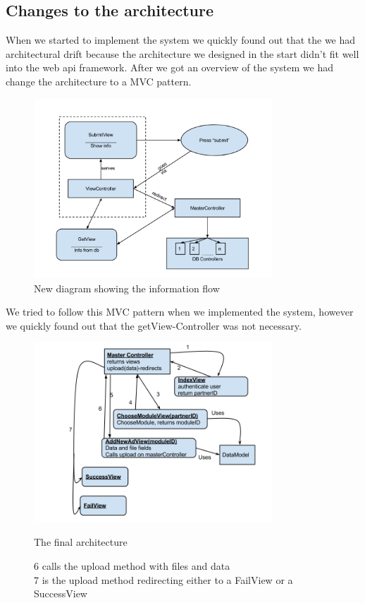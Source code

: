 \subsection{Changes to the architecture}
When we started to implement the system we quickly found out that the we had architectural drift because the architecture we designed in the start didn't fit well into the web api framework. After we got an overview of the system we had change the architecture to a MVC pattern. 
\begin{figure}[H]
\centering
\includegraphics[width=0.8\textwidth]{images/architecture03_revised1.png}
\caption{New diagram showing the information flow}
\label{fig:info_flow}
\end{figure}
We tried to follow this MVC pattern when we implemented the system, however we quickly found out that the getView-Controller was not necessary.
\begin{center}
\begin{figure}[H]
\centering
\includegraphics[width=0.8\textwidth]{images/architecture_final01.png}
\caption{The final architecture}
\caption*{6 calls the upload method with files and data\\
7 is the upload method redirecting either to a FailView or a SuccessView}
\label{fig:architecture}
\end{figure}
\end{center}
